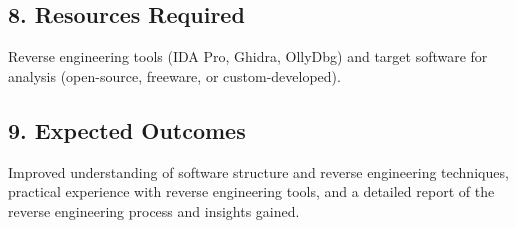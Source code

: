 \documentclass{article}
\begin{document}
\subsection*{8. Resources Required}
Reverse engineering tools (IDA Pro, Ghidra, OllyDbg) and target software for analysis (open-source, freeware, or custom-developed).

\subsection*{9. Expected Outcomes}
Improved understanding of software structure and reverse engineering techniques, practical experience with reverse engineering tools, and a detailed report of the reverse engineering process and insights gained.
\end{document}
